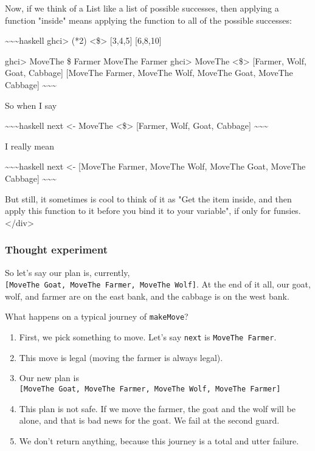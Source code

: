 \documentclass[]{article}
\begin{document}
Now, if we think of a List like a list of possible successes, then applying a
function "inside" means applying the function to all of the possible successes:

\textasciitilde{}\textasciitilde{}\textasciitilde{}haskell ghci\textgreater{}
(*2) \textless{}\$\textgreater{} {[}3,4,5{]} {[}6,8,10{]}

ghci\textgreater{} MoveThe \$ Farmer MoveThe Farmer ghci\textgreater{} MoveThe
\textless{}\$\textgreater{} {[}Farmer, Wolf, Goat, Cabbage{]} {[}MoveThe Farmer,
MoveThe Wolf, MoveThe Goat, MoveThe Cabbage{]}
\textasciitilde{}\textasciitilde{}\textasciitilde{}

So when I say

\textasciitilde{}\textasciitilde{}\textasciitilde{}haskell next \textless{}-
MoveThe \textless{}\$\textgreater{} {[}Farmer, Wolf, Goat, Cabbage{]}
\textasciitilde{}\textasciitilde{}\textasciitilde{}

I really mean

\textasciitilde{}\textasciitilde{}\textasciitilde{}haskell next \textless{}-
{[}MoveThe Farmer, MoveThe Wolf, MoveThe Goat, MoveThe Cabbage{]}
\textasciitilde{}\textasciitilde{}\textasciitilde{}

But still, it sometimes is cool to think of it as "Get the item inside, and then
apply this function to it before you bind it to your variable", if only for
funsies. \textless{}/div\textgreater{}

\subsubsection{Thought experiment}

So let's say our plan is, currently,
\texttt{{[}MoveThe\ Goat,\ MoveThe\ Farmer,\ MoveThe\ Wolf{]}}. At the end of it
all, our goat, wolf, and farmer are on the east bank, and the cabbage is on the
west bank.

What happens on a typical journey of \texttt{makeMove}?

\begin{enumerate}
\tightlist
\item
  First, we pick something to move. Let's say \texttt{next} is
  \texttt{MoveThe\ Farmer}.
\item
  This move is legal (moving the farmer is always legal).
\item
  Our new plan is
  \texttt{{[}MoveThe\ Goat,\ MoveThe\ Farmer,\ MoveThe\ Wolf,\ MoveThe\ Farmer{]}}
\item
  This plan is not safe. If we move the farmer, the goat and the wolf will be
  alone, and that is bad news for the goat. We fail at the second guard.
\item
  We don't return anything, because this journey is a total and utter failure.
\end{enumerate}
\end{document}
